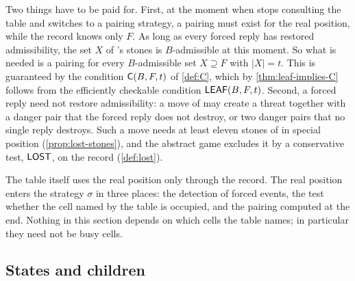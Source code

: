 Two things have to be paid for. First, at the moment when \Breaker{} stops consulting the table and switches
to a pairing strategy, a pairing must exist for the real position, while the record knows only $F$. As long
as every forced reply has restored admissibility, the set $X$ of \Maker's stones is $B$-admissible at this
moment. So what is needed is a pairing for every $B$-admissible set $X\supseteq F$ with $|X|=t$. This is
guaranteed by the condition $\mathsf{C}(B,F,t)$ of \cref{def:C}, which by \cref{thm:leaf-implies-C} follows from
the efficiently checkable condition $\mathsf{LEAF}(B,F,t)$. Second, a forced reply need not restore admissibility:
a move of \Maker{} may create a threat together with a danger pair that the forced reply does not destroy,
or two danger pairs that no single reply destroys. Such a move needs at least eleven stones of \Maker{} in
special position (\cref{prop:lost-stones}), and the abstract game excludes it by a conservative
test, $\mathsf{LOST}$, on the record (\cref{def:lost}).

The table itself uses the real position only through the record. The real position enters the strategy
$\sigma$ in three places: the detection of forced events, the test whether the cell named by the table is
occupied, and the pairing computed at the end. Nothing in this section depends on which cells the table
names; in particular they need not be busy cells.

\subsection{States and children}\label{sec:states}

